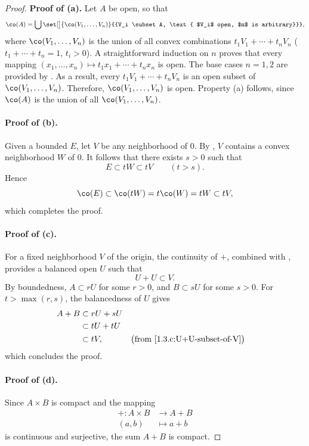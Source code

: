 \begin{proof}%
\textbf{Proof of (a).} Let $A$ be open, so that 
%
\begin{equation}
  \co(A) = \bigcup \set[\big]{\co(V_1, \dots, V_n)}{{V_i \subset A, \text{ $V_i$ open, $n$ is arbitrary}}},
\end{equation}
%
where $\co(V_1, \dots, V_n)$ is the union of all convex combinations $t_1 V_1 +\cdots + t_n V_n$ %
($t_1 + \cdots + t_n = 1$, $t_i > 0$). A straightforward induction on $n$ proves that every mapping %
$(x_1, \dots, x_n) \mapsto t_1 x_1 + \cdots + t_n x_n$ is open. The base cases $n=1, 2$ are provided by . %
As a result, every $t_1 V_1 +\cdots + t_n V_n$ is an open subset of $\co(V_1,\dots,V_n)$. Therefore, $\co(V_1,\dots,V_n)$ is %
open. Property (a) follows, since $\co(A)$ is the union of all $\co(V_1,\dots, V_n)$.
\paragraph{Proof of (b).} Given a bounded $E$, let $V$ be any neighborhood of $0$. By , $V$ contains a convex 
neighborhood $W$ of $0$. It follows that there exists $s > 0$ such that
%
\begin{equation}
  E \subset tW \subset tV \qquad (t > s). 
\end{equation}
%
Hence %
%
\begin{equation}
  \co(E) \subset \co(tW) = t\co(W) = t W \subset tV, 
\end{equation}
%
which completes the proof. %
%
\paragraph{Proof of (c).} For a fixed neighborhood $V$ of the origin, the continuity of $+$, combined with , %
provides a balanced open $U$ such that %
%
\begin{equation}\label{1.3.c:U+U-subset-of-V}
  U + U\subset V. 
\end{equation}
%
By boundedness, $A \subset r U$ for some $r> 0$, and $B \subset s U$ for some $s>0$. For $t > \max(r,s)$, the balancedness of %
$U$ gives 
%
\begin{align}
  A+B & \subset  r U + s U \\
  & \subset t U + t U \\
  &\subset t V, && \bigl(\text{from }\eqref{1.3.c:U+U-subset-of-V}\bigr)
\end{align}
%
which concludes the proof. %
%
\paragraph{Proof of (d).} Since $A \times B$ is compact and the mapping
%
\begin{align}
  +: A \times B &\to A + B \\\nonumber
  (a,b) &\mapsto a + b 
\end{align}
%
is continuous and surjective, the sum $A + B$ is compact. 
%

\end{proof}

